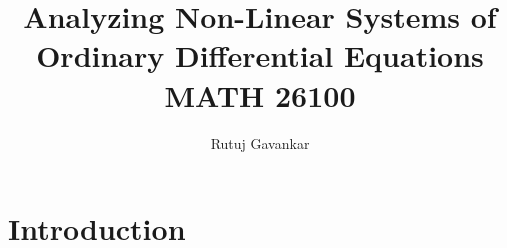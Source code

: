 \documentclass[12pt]{article}
\title{Analyzing Non-Linear Systems of Ordinary Differential Equations \\ \small{MATH 26100}}
\author{Rutuj Gavankar}
\date{}
\begin{document}
\maketitle

\section{Introduction}
\end{document}
